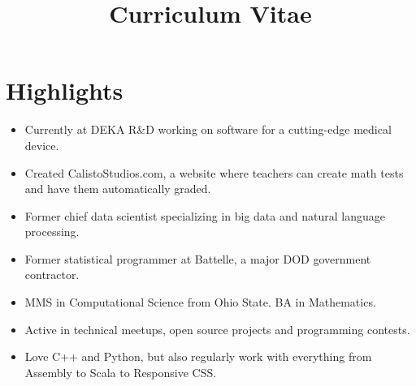 \documentclass[11pt,a4paper,sans]{moderncv} %
\title{Curriculum Vitae}
\begin{document}
\makecvtitle %

\section{Highlights}
\begin{itemize}
\item Currently at DEKA R\&D working on software for a cutting-edge medical device.
\item Created CalistoStudios.com, a website where teachers can create math tests and have them automatically graded.
\item Former chief data scientist specializing in big data and natural language processing.
\item Former statistical programmer at Battelle, a major DOD government contractor.
\item MMS in Computational Science from Ohio State. BA in Mathematics.
\item Active in technical meetups, open source projects and programming contests.
\item Love C++ and Python, but also regularly work with everything from Assembly to Scala to Responsive CSS.
\end{itemize}
\end{document}
